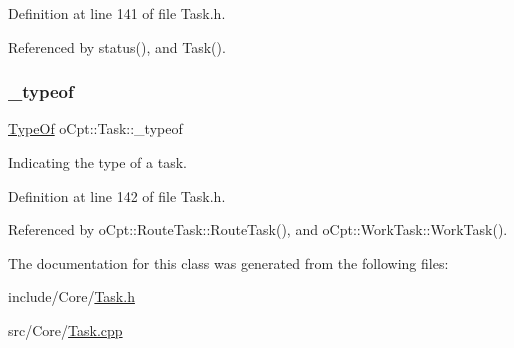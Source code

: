 Definition at line 141 of file Task.\+h.



Referenced by status(), and Task().

\hypertarget{classo_cpt_1_1_task_ac4073446fdd30a1f2296da6b6fcaf802}{}\label{classo_cpt_1_1_task_ac4073446fdd30a1f2296da6b6fcaf802} 
\subsubsection{\texorpdfstring{\+\_\+typeof}{\_typeof}}
{\footnotesize\ttfamily \hyperlink{classo_cpt_1_1i_task_a10d8726eb8957c2c305f468cf15b9f11}{Type\+Of} o\+Cpt\+::\+Task\+::\+\_\+typeof\hspace{0.3cm}{\ttfamily [protected]}}



Indicating the type of a task. 



Definition at line 142 of file Task.\+h.



Referenced by o\+Cpt\+::\+Route\+Task\+::\+Route\+Task(), and o\+Cpt\+::\+Work\+Task\+::\+Work\+Task().



The documentation for this class was generated from the following files\+:\begin{DoxyCompactItemize}
\item 
include/\+Core/\hyperlink{_task_8h}{Task.\+h}\item 
src/\+Core/\hyperlink{_task_8cpp}{Task.\+cpp}\end{DoxyCompactItemize}
